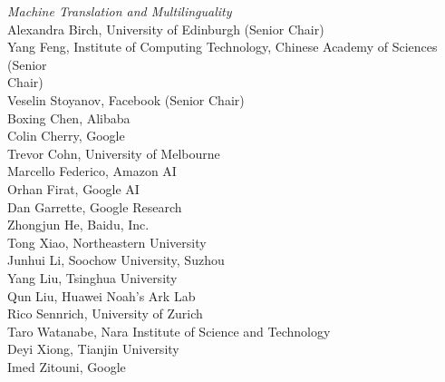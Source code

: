 \emph{Machine Translation and Multilinguality} \\
\hspace*{0.2in} Alexandra Birch, University of Edinburgh (Senior Chair)\\
\hspace*{0.2in} Yang Feng, Institute of Computing Technology, Chinese Academy of Sciences (Senior\\
\hspace*{0.2in} Chair)\\
\hspace*{0.2in} Veselin Stoyanov, Facebook (Senior Chair)\\
\hspace*{0.2in} Boxing Chen, Alibaba\\
\hspace*{0.2in} Colin Cherry, Google\\
\hspace*{0.2in} Trevor Cohn, University of Melbourne\\
\hspace*{0.2in} Marcello Federico, Amazon AI\\
\hspace*{0.2in} Orhan Firat, Google AI\\
\hspace*{0.2in} Dan Garrette, Google Research\\
\hspace*{0.2in} Zhongjun He, Baidu, Inc.\\
\hspace*{0.2in} Tong Xiao, Northeastern University\\
\hspace*{0.2in} Junhui Li, Soochow University, Suzhou\\
\hspace*{0.2in} Yang Liu, Tsinghua University\\
\hspace*{0.2in} Qun Liu, Huawei Noah's Ark Lab\\
\hspace*{0.2in} Rico Sennrich, University of Zurich\\
\hspace*{0.2in} Taro Watanabe, Nara Institute of Science and Technology\\
\hspace*{0.2in} Deyi Xiong, Tianjin University\\
\hspace*{0.2in} Imed Zitouni, Google\\

